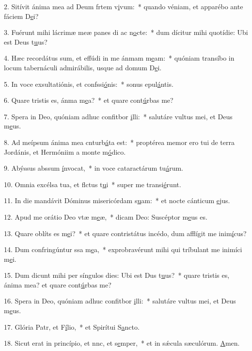 2. Sitívit ánima mea ad Deum frtem v\uline{i}vum:~* quando véniam, et apparébo ante fáciem D\uline{e}i?\par 
3. Fuérunt mihi lácrimæ meæ panes di ac n\uline{o}cte:~* dum dícitur mihi quotídie: Ubi est Deus t\uline{u}us?\par 
4. Hæc recordátus sum, et effúdi in me ánmam m\uline{e}am:~* quóniam transíbo in locum tabernáculi admirábilis, usque ad domum D\uline{e}i.\par 
5. In voce exsultatiónis, et confssi\uline{ó}nis:~* sonus epul\uline{á}ntis.\par 
6. Quare tristis es, ánma m\uline{e}a?~* et quare cont\uline{ú}rbas me?\par 
7. Spera in Deo, quóniam adhuc confitbor \uline{i}lli:~* salutáre vultus mei, et Deus m\uline{e}us.\par 
8. Ad meípsum ánima mea cnturb\uline{á}ta est:~* proptérea memor ero tui de terra Jordánis, et Hermóniim a monte m\uline{ó}dico.\par 
9. Abýssus abssum \uline{í}nvocat,~* in voce cataractárum tu\uline{á}rum.\par 
10. Omnia excélsa tua, et flctus t\uline{u}i~* super me transi\uline{é}runt.\par 
11. In die mandávit Dóminus misericórdam s\uline{u}am:~* et nocte cánticum \uline{e}jus.\par 
12. Apud me orátio Deo vtæ m\uline{e}æ,~* dicam Deo: Suscéptor m\uline{e}us es.\par 
13. Quare oblíts es m\uline{e}i?~* et quare contristátus incédo, dum afflígit me inim\uline{í}cus?\par 
14. Dum confringúntur ssa m\uline{e}a,~* exprobravérunt mihi qui tríbulant me inimíci m\uline{e}i.\par 
15. Dum dicunt mihi per síngulos dies: Ubi est Dus t\uline{u}us?~* quare tristis es, ánima mea? et quare cont\uline{ú}rbas me?\par 
16. Spera in Deo, quóniam adhuc confitbor \uline{i}lli:~* salutáre vultus mei, et Deus m\uline{e}us.\par 
17. Glória Patr, et F\uline{í}lio,~* et Spirítui S\uline{a}ncto.\par 
18. Sicut erat in princípio, et nnc, et s\uline{e}mper,~* et in sǽcula sæculórum. \uline{A}men.\par 
